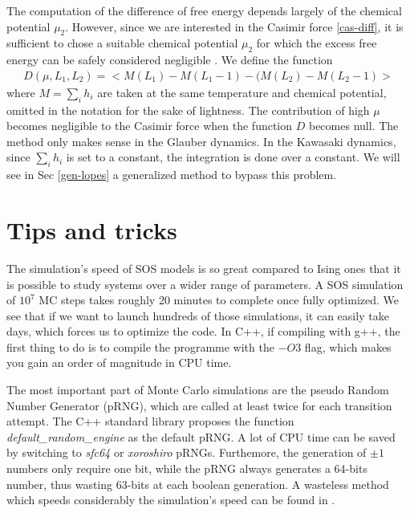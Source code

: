 {\color{red}
The computation of the difference of free energy depends largely of the chemical potential $\mu_2$. However, since we are interested in the Casimir force \eqref{cas-diff}, it is sufficient to chose a suitable chemical potential $\mu_2$ for which the excess free energy can be safely considered negligible \cite{lopes_cardozo_critical_2014} . We define the function
\begin{align}
    D(\mu,L_1,L_2) =  < M(L_1)-M(L_1-1) - (M(L_2)-M(L_2-1) >
    \label{function-d}
\end{align}
where $M=\sum_i h_i$ 
are taken at the same temperature and chemical potential, 
omitted in the notation for the sake of lightness. The contribution of high $\mu$ becomes negligible to the Casimir force when the function $D$ becomes null.
}
{\color{red} The method only makes sense in the Glauber dynamics. In the Kawasaki dynamics, since $\sum_i h_i$ is set to a constant, the integration is done over a constant. We will see in Sec \ref{gen-lopes} a generalized method to bypass this problem.}

\section{Tips and tricks}

The simulation's speed of SOS models is so great compared to Ising ones that it is possible to study systems over a wider range of parameters. A SOS simulation of $10^7$ MC steps takes roughly 20 minutes to complete once fully optimized. We see that if we want to launch hundreds of those simulations, it can easily take days, which forces us to optimize the code.
In C++, if compiling with g++, the first thing to do is to compile the programme with the $-O3$ flag, which makes you gain an order of magnitude in CPU time.

The most important part of Monte Carlo simulations are the pseudo Random Number Generator (pRNG), which are called at least twice for each transition attempt. The C++ standard library proposes the function \textit{default\_random\_engine} as the default pRNG. A lot of CPU time can be saved by switching to \textit{sfc64} or \textit{xoroshiro} pRNGs. Furthemore, the generation of $\pm1$ numbers only require one bit, while the pRNG always generates a 64-bits number, thus wasting 63-bits at each boolean generation. A wasteless method which speeds considerably the simulation's speed can be found in \cite{martin_ankerl_fast_nodate}.

